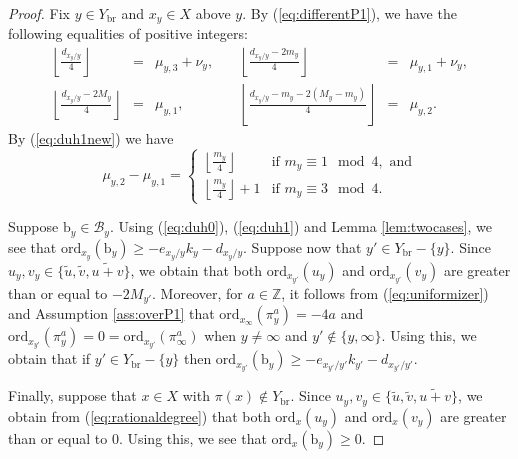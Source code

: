 \documentclass{amsart}
\numberwithin{equation}{section}
\numberwithin{table}{section}
\theoremstyle{plain}
\theoremstyle{definition}
\theoremstyle{remark}
\begin{document}
\begin{proof}
Fix $y\in Y_{\mathrm{br}}$ and $x_y\in X$ above $y$. By (\ref{eq:differentP1}), we have the following equalities of positive integers:
\begin{equation}
\label{eq:duh0}
\begin{array}{cclccl}
\left\lfloor \frac{d_{x_y/y}}{4} \right\rfloor &=& \mu_{y,3} + \nu_y,\quad&
\left\lfloor \frac{d_{x_y/y}-2m_y}{4} \right\rfloor &=& \mu_{y,1} + \nu_y,\\[1ex]
\left\lfloor \frac{d_{x_y/y}-2M_y}{4} \right\rfloor &=& \mu_{y,1},&
\left\lfloor \frac{d_{x_y/y}-m_y-2(M_y-m_y)}{4} \right\rfloor &=& \mu_{y,2}.
\end{array}
\end{equation}
By (\ref{eq:duh1new}) we have
\begin{equation}
\label{eq:duh1}
\mu_{y,2}-\mu_{y,1} 
= \left\{\begin{array}{ll} \textstyle{\left\lfloor \frac{m_y}{4}\right\rfloor}  & \mbox{if } m_y\equiv 1 \mod 4, \mbox{ and}\\
\textstyle{\left\lfloor \frac{m_y}{4}\right\rfloor +1} & \mbox{if } m_y\equiv 3 \mod 4.
\end{array}\right.
\end{equation}

Suppose $\mathrm{b}_y\in\mathcal{B}_y$. Using (\ref{eq:duh0}), (\ref{eq:duh1}) and Lemma \ref{lem:twocases}, we see that $\mathrm{ord}_{x_y}(\mathrm{b}_y)\ge -e_{x_y/y}k_y-d_{x_y/y}$.
Suppose now that $y'\in Y_{\mathrm{br}}-\{y\}$. Since $u_y,v_y\in\{\widetilde{u},\widetilde{v},\widetilde{u+v}\}$, we obtain that both $\mathrm{ord}_{x_{y'}}(u_y)$ and $\mathrm{ord}_{x_{y'}}(v_y)$ are greater than or equal to $-2M_{y'}$. Moreover, for $a\in \mathbb{Z}$, it follows from (\ref{eq:uniformizer}) and Assumption \ref{ass:overP1} that $\mathrm{ord}_{x_{\infty}}(\pi_y^a)=-4a$ and $\mathrm{ord}_{x_{y'}}(\pi_y^a) = 0 = \mathrm{ord}_{x_{y'}}(\pi_\infty^a)$ when $y\ne \infty$ and $y'\not\in\{y,\infty\}$.
Using this, we obtain that if $y'\in Y_{\mathrm{br}}-\{y\}$ then $\mathrm{ord}_{x_{y'}}(\mathrm{b}_y)\ge -e_{x_{y'}/y'}k_{y'}-d_{x_{y'}/y'}$. 

Finally, suppose that $x\in X$ with $\pi(x)\not\in Y_{\mathrm{br}}$. Since $u_y,v_y \in \{\widetilde{u},\widetilde{v},\widetilde{u+v}\}$, we obtain from (\ref{eq:rationaldegree}) that both $\mathrm{ord}_x(u_y)$ and $\mathrm{ord}_x(v_y)$ are greater than or equal to $0$. Using this, we see that $\mathrm{ord}_x(\mathrm{b}_y)\ge 0$.


\end{proof}
\end{document}
